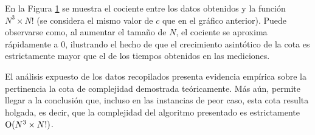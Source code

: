             En la Figura \ref{fig:exp3:part_tiempo_sobre_exp} se muestra el cociente entre los datos obtenidos y la función $N^3 \times N!$ (se considera el mismo valor de $c$ que en el gráfico anterior). Puede observarse como, al aumentar el tamaño de $N$, el cociente se aproxima rápidamente a $0$, ilustrando el hecho de que el crecimiento asintótico de la cota es estrictamente mayor que el de los tiempos obtenidos en las mediciones.

            \begin{figure}[H]
                \centering
                \caption{}
                \label{fig:exp3:part_tiempo_sobre_exp}
            \end{figure}

            El análisis expuesto de los datos recopilados presenta evidencia empírica sobre la pertinencia la cota de complejidad demostrada teóricamente. Más aún, permite llegar a la conclusión que, incluso en las instancias de peor caso, esta cota resulta holgada, es decir, que la complejidad del algoritmo presentado es estrictamente $\operatorname{O}(N^3 \times N!)$.

